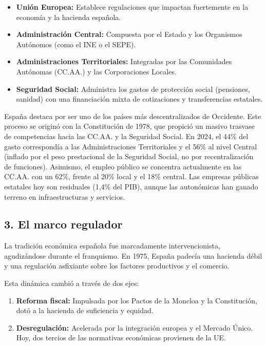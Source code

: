 \begin{itemize}
  \item \textbf{Unión Europea:} Establece regulaciones que impactan fuertemente en la economía y la hacienda española.
  \item \textbf{Administración Central:} Compuesta por el Estado y los Organismos Autónomos (como el INE o el SEPE).
  \item \textbf{Administraciones Territoriales:} Integradas por las Comunidades Autónomas (CC.AA.) y las Corporaciones Locales.
  \item \textbf{Seguridad Social:} Administra los gastos de protección social (pensiones, sanidad) con una financiación mixta de cotizaciones y transferencias estatales.
\end{itemize}

España destaca por ser uno de los países más descentralizados de Occidente. Este proceso se originó con la Constitución de 1978, que propició un masivo trasvase de competencias hacia las CC.AA. y la Seguridad Social. En 2024, el 44\% del gasto correspondía a las Administraciones Territoriales y el 56\% al nivel Central (inflado por el peso prestacional de la Seguridad Social, no por recentralización de funciones). Asimismo, el empleo público se concentra actualmente en las CC.AA. con un 62\%, frente al 20\% local y el 18\% central. Las empresas públicas estatales hoy son residuales (1,4\% del PIB), aunque las autonómicas han ganado terreno en infraestructuras y servicios.

\subsection*{3. El marco regulador}

La tradición económica española fue marcadamente intervencionista, agudizándose durante el franquismo. En 1975, España padecía una hacienda débil y una regulación asfixiante sobre los factores productivos y el comercio.

Esta dinámica cambió a través de dos ejes:

\begin{enumerate}
  \item \textbf{Reforma fiscal:} Impulsada por los Pactos de la Moncloa y la Constitución, dotó a la hacienda de suficiencia y equidad.
  \item \textbf{Desregulación:} Acelerada por la integración europea y el Mercado Único. Hoy, dos tercios de las normativas económicas provienen de la UE.
\end{enumerate}

